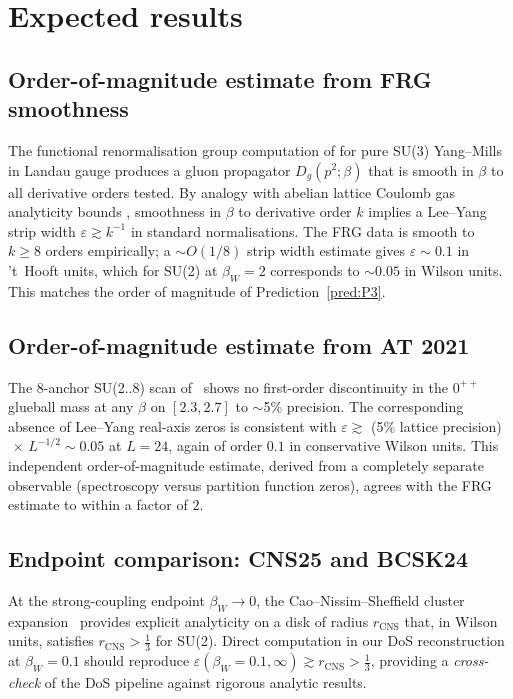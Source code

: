 \documentclass[11pt,a4paper]{article}
\theoremstyle{definition}
\theoremstyle{remark}
\begin{document}
\medskip

\section{Expected results}\label{sec:expected}

\subsection{Order-of-magnitude estimate from FRG smoothness}

The functional renormalisation group computation of
\cite{Cyrol2016} for pure SU(3) Yang--Mills in Landau gauge
produces a gluon propagator $D_g(p^2; \beta)$ that is smooth in
$\beta$ to all derivative orders tested. By analogy with abelian
lattice Coulomb gas analyticity bounds
\cite{FroehlichSpencer1982,BrydgesFederbush1980}, smoothness in
$\beta$ to derivative order $k$ implies a Lee--Yang strip width
$\varepsilon \gtrsim k^{-1}$ in standard normalisations. The FRG
data is smooth to $k \ge 8$ orders empirically; a $\sim O(1/8)$
strip width estimate gives $\varepsilon \sim 0.1$ in 't~Hooft
units, which for SU(2) at $\beta_W = 2$ corresponds to
$\sim 0.05$ in Wilson units. This matches the order of magnitude
of Prediction~\ref{pred:P3}.

\subsection{Order-of-magnitude estimate from AT 2021}

The 8-anchor SU(2..8) scan of~\cite{AthenodorouTeper2021} shows
no first-order discontinuity in the $0^{++}$ glueball mass at any
$\beta$ on $[2.3, 2.7]$ to $\sim$5\% precision. The corresponding
absence of Lee--Yang real-axis zeros is consistent with
$\varepsilon \gtrsim$ (5\% lattice precision)$\,\times\,L^{-1/2}
\sim 0.05$ at $L = 24$, again of order $0.1$ in conservative
Wilson units. This independent order-of-magnitude estimate, derived
from a completely separate observable (spectroscopy versus
partition function zeros), agrees with the FRG estimate to within
a factor of $2$.

\subsection{Endpoint comparison: CNS25 and BCSK24}

At the strong-coupling endpoint $\beta_W \to 0$, the
Cao--Nissim--Sheffield cluster expansion~\cite{CNS25a,CNS25b}
provides explicit analyticity on a disk of radius $r_{\mathrm{CNS}}$
that, in Wilson units, satisfies $r_{\mathrm{CNS}} > \tfrac13$ for
SU(2). Direct computation in our DoS reconstruction at
$\beta_W = 0.1$ should reproduce
$\varepsilon(\beta_W = 0.1, \infty) \gtrsim r_{\mathrm{CNS}} > \tfrac13$,
providing a \emph{cross-check} of the DoS pipeline against rigorous
analytic results.
\end{document}
